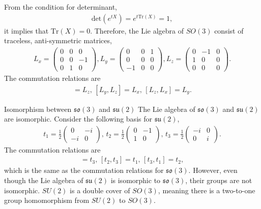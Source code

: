 \documentclass{beamer}
\begin{document}
\begin{frame}
\justify
From the condition for determinant,
\begin{align}
\text{det} (e^{tX}) = e^{t \text{Tr} (X)} = 1,
\end{align}
it implies that $\text{Tr} (X) = 0$.
\vfill
Therefore, the Lie algebra of $SO(3)$ consist of traceless, anti-symmetric matrices,
\begin{align}
L_x = \begin{pmatrix} 0 & 0 & 0 \\ 0 & 0 & -1 \\ 0 & 1 & 0 \end{pmatrix}, L_y = \begin{pmatrix} 0 & 0 & 1 \\ 0 & 0 & 0 \\ -1 & 0 & 0 \end{pmatrix}, L_z = \begin{pmatrix} 0 & -1 & 0 \\ 1 & 0 & 0 \\ 0 & 0 & 0 \end{pmatrix}.
\end{align}
\vfill
The commutation relations are
\begin{align}
[L_x, L_y] = L_z,\, [L_y, L_z] = L_x,\, [L_z, L_x] = L_y.
\end{align}
\end{frame}

\begin{frame}{Isomorphism between $\mathfrak{so}(3)$ and $\mathfrak{su}(2)$}
\justify
The Lie algebra of $\mathfrak{so}(3)$ and $\mathfrak{su}(2)$ are isomorphic. Consider the following basis for $\mathfrak{su}(2)$,
\begin{align}
t_1 = \frac{1}{2} \begin{pmatrix} 0 & -i \\ -i & 0 \end{pmatrix},\, t_2 = \frac{1}{2} \begin{pmatrix} 0 & -1 \\ 1 & 0 \end{pmatrix},\, t_3 = \frac{1}{2} \begin{pmatrix} -i & 0 \\ 0 & i \end{pmatrix}.
\end{align}
\vfill
The commutation relations are
\begin{align}
[t_1, t_2] = t_3,\, [t_2, t_3] = t_1,\, [t_3, t_1] = t_2,
\end{align}
which is the same as the commutation relations for $\mathfrak{so}(3)$.
\vfill
However, even though the Lie algebra of $\mathfrak{su}(2)$ is isomorphic to $\mathfrak{so}(3)$, their groups are not isomorphic.
\vfill
$SU(2)$ is a double cover of $SO(3)$, meaning there is a two-to-one group homomorphism from $SU(2)$ to $SO(3)$.
\end{frame}
\end{document}
